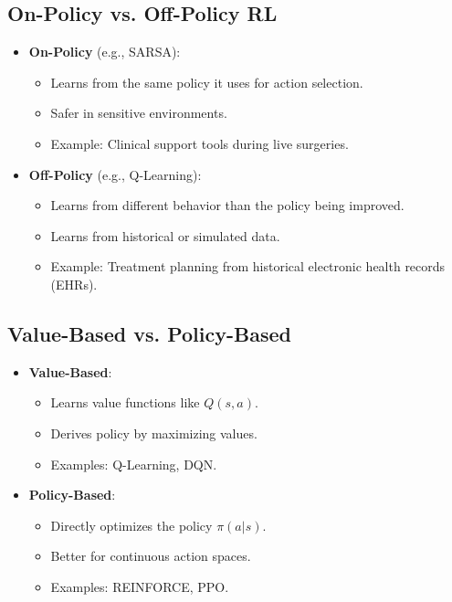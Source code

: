 \documentclass[12pt]{article}
\begin{document}
\subsection{On-Policy vs. Off-Policy RL}
\begin{itemize}
    \item \textbf{On-Policy} (e.g., SARSA):
    \begin{itemize}
        \item Learns from the same policy it uses for action selection.
        \item Safer in sensitive environments.
        \item Example: Clinical support tools during live surgeries.
    \end{itemize}
    \item \textbf{Off-Policy} (e.g., Q-Learning):
    \begin{itemize}
        \item Learns from different behavior than the policy being improved.
        \item Learns from historical or simulated data.
        \item Example: Treatment planning from historical electronic health records (EHRs).
    \end{itemize}
\end{itemize}

\subsection{Value-Based vs. Policy-Based}
\begin{itemize}
    \item \textbf{Value-Based}:
    \begin{itemize}
        \item Learns value functions like $Q(s,a)$.
        \item Derives policy by maximizing values.
        \item Examples: Q-Learning, DQN.
    \end{itemize}
    \item \textbf{Policy-Based}:
    \begin{itemize}
        \item Directly optimizes the policy $\pi(a|s)$.
        \item Better for continuous action spaces.
        \item Examples: REINFORCE, PPO.
    \end{itemize}
\end{itemize}
\end{document}
